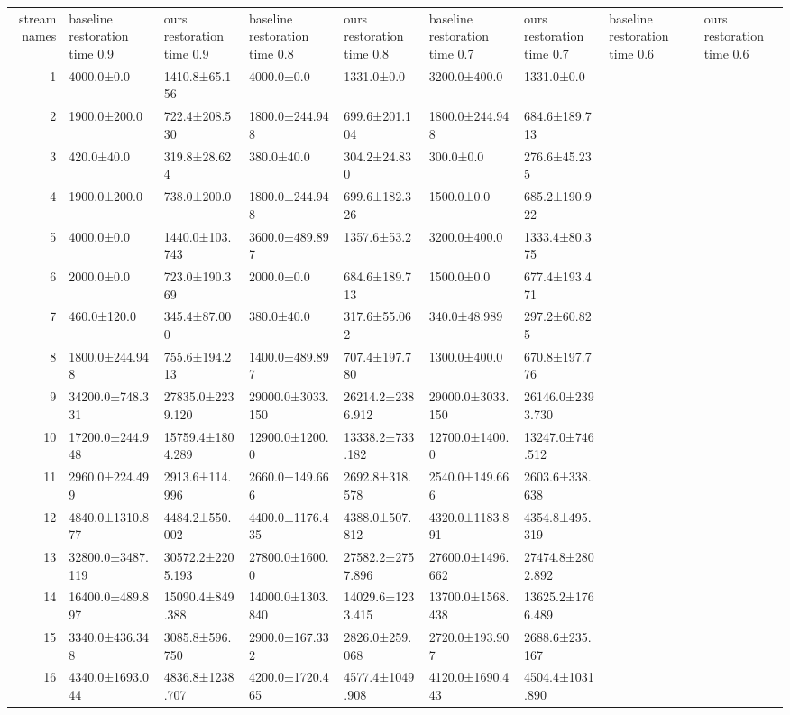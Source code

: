 \begin{tabular}{|r|l|l|l|l|l|l|l|l|}
  \hline
  stream names & baseline restoration time 0.9 & ours restoration time 0.9 & baseline restoration time 0.8 & ours restoration time 0.8 & baseline restoration time 0.7 & ours restoration time 0.7 & baseline restoration time 0.6 & ours restoration time 0.6 \\ 
  1 & 4000.0±0.0 & 1410.8±65.156 & 4000.0±0.0 & 1331.0±0.0 & 3200.0±400.0 & 1331.0±0.0 \\ 
  2 & 1900.0±200.0 & 722.4±208.530 & 1800.0±244.948 & 699.6±201.104 & 1800.0±244.948 & 684.6±189.713 \\ 
  3 & 420.0±40.0 & 319.8±28.624 & 380.0±40.0 & 304.2±24.830 & 300.0±0.0 & 276.6±45.235 \\ 
  4 & 1900.0±200.0 & 738.0±200.0 & 1800.0±244.948 & 699.6±182.326 & 1500.0±0.0 & 685.2±190.922 \\ 
  5 & 4000.0±0.0 & 1440.0±103.743 & 3600.0±489.897 & 1357.6±53.2 & 3200.0±400.0 & 1333.4±80.375 \\ 
  6 & 2000.0±0.0 & 723.0±190.369 & 2000.0±0.0 & 684.6±189.713 & 1500.0±0.0 & 677.4±193.471 \\ 
  7 & 460.0±120.0 & 345.4±87.000 & 380.0±40.0 & 317.6±55.062 & 340.0±48.989 & 297.2±60.825 \\ 
  8 & 1800.0±244.948 & 755.6±194.213 & 1400.0±489.897 & 707.4±197.780 & 1300.0±400.0 & 670.8±197.776 \\ 
  9 & 34200.0±748.331 & 27835.0±2239.120 & 29000.0±3033.150 & 26214.2±2386.912 & 29000.0±3033.150 & 26146.0±2393.730 \\ 
  10 & 17200.0±244.948 & 15759.4±1804.289 & 12900.0±1200.0 & 13338.2±733.182 & 12700.0±1400.0 & 13247.0±746.512 \\ 
  11 & 2960.0±224.499 & 2913.6±114.996 & 2660.0±149.666 & 2692.8±318.578 & 2540.0±149.666 & 2603.6±338.638 \\ 
  12 & 4840.0±1310.877 & 4484.2±550.002 & 4400.0±1176.435 & 4388.0±507.812 & 4320.0±1183.891 & 4354.8±495.319 \\ 
  13 & 32800.0±3487.119 & 30572.2±2205.193 & 27800.0±1600.0 & 27582.2±2757.896 & 27600.0±1496.662 & 27474.8±2802.892 \\ 
  14 & 16400.0±489.897 & 15090.4±849.388 & 14000.0±1303.840 & 14029.6±1233.415 & 13700.0±1568.438 & 13625.2±1766.489 \\ 
  15 & 3340.0±436.348 & 3085.8±596.750 & 2900.0±167.332 & 2826.0±259.068 & 2720.0±193.907 & 2688.6±235.167 \\ 
  16 & 4340.0±1693.044 & 4836.8±1238.707 & 4200.0±1720.465 & 4577.4±1049.908 & 4120.0±1690.443 & 4504.4±1031.890 \\ 

\end{tabular}
